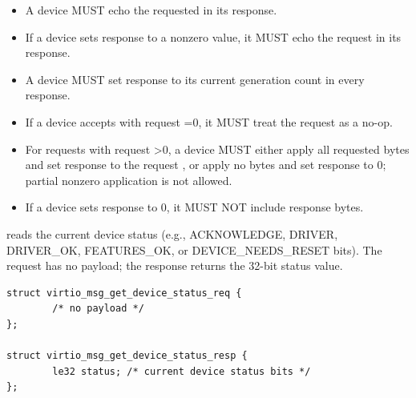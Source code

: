 \begin{itemize}
  \item A device MUST echo the requested  in its response.
  \item If a device sets response  to a nonzero value, it MUST
        echo the request  in its response.
  \item A device MUST set response  to its current generation
        count in every  response.
  \item If a device accepts  with request =0,
        it MUST treat the request as a no-op.
  \item For  requests with request >0, a
        device MUST either apply all requested bytes and set response
         to the request , or apply no bytes and set
        response  to 0; partial nonzero application is not
        allowed.
  \item If a device sets response  to 0, it MUST NOT include
        response  bytes.
\end{itemize}


 reads the current device status (e.g., ACKNOWLEDGE,
DRIVER, DRIVER\_OK, FEATURES\_OK, or DEVICE\_NEEDS\_RESET bits). The request has
no payload; the response returns the 32-bit status value.

\begin{lstlisting}
struct virtio_msg_get_device_status_req {
        /* no payload */
};

struct virtio_msg_get_device_status_resp {
        le32 status; /* current device status bits */
};
\end{lstlisting}

